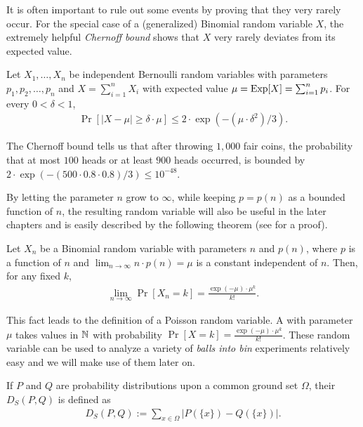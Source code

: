 It is often important to rule out some events by proving that they very
rarely occur. For the special case of a (generalized) Binomial random
variable $X$, the extremely helpful \emph{Chernoff bound} shows that $X$
very rarely deviates from its expected value.

\begin{theorem}
Let $X_{1},\ldots,X_{n}$ be independent Bernoulli random variables
with parameters $p_{1},p_{2},\ldots,p_{n}$ and $X=\sum_{i=1}^{n}X_{i}$
with expected value $\mu=\operatorname{Exp}[X]=\sum_{i=1}^{n}p_{i}$. For every $0< \delta < 1$,
\begin{align*}
  \Pr[|X-\mu|\geq \delta\cdot \mu]\leq 2\cdot \exp(-(\mu\cdot \delta^{2})/3).
\end{align*}
\end{theorem}


\begin{example}
  The Chernoff bound tells us that after throwing $1{,}000$ fair coins,
  the probability that at most $100$ heads or at least $900$ heads
  occurred, is bounded by $2\cdot \exp(-(500\cdot 0{.}8\cdot
  0{.}8)/3)\leq 10^{-48}$.
\end{example}


By letting the parameter $n$ grow to $\infty$, while keeping $p=p(n)$ as
a bounded function of $n$, the resulting random variable will also be
useful in the later chapters and is easily described by the following
theorem (see \eg \cite[pp. 98-99]{mitzenmacher2005probability} for a proof). 

\begin{theorem}
  Let $X_{n}$ be a Binomial random variable with parameters $n$ and $p(n)$,
  where $p$ is a function of $n$ and $\lim_{n\to \infty} n\cdot
  p(n)=\mu$ is a constant independent of $n$. Then, for any fixed
  $k$, 
  \begin{align*}
    \lim_{n\to \infty}\Pr[X_{n}=k]=\frac{\exp(-\mu)\cdot \mu^{k}}{k!}. 
  \end{align*}
\end{theorem}

This fact leads to the definition of a Poisson random variable. A
 with parameter $\mu$ takes values in
$\mathbb{N}$ with probability $\Pr[X=k]=\frac{\exp(-\mu)\cdot \mu^{k}}{k!}$. These random
variable can be used to analyze a variety of \emph{balls into bin}
experiments relatively easy and we will make use of them later on. 

If $P$ and $Q$ are probability distributions upon a common ground set
$\Omega$, their  $D_{S}(P,Q)$ is defined as
\begin{align*}
  D_{S}(P,Q) := \sum_{x\in \Omega}| P(\{x\}) - Q(\{x\})|.
\end{align*}


